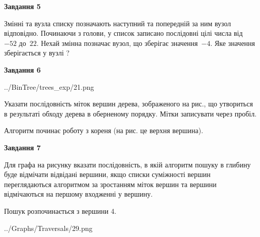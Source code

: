 \documentclass[12pt, ukrainian]{article}
\begin{document}
{\begin {large}
{\begin {center}\textbf{Завдання 5}\end {center}}\par
Змінні  та  вузла списку позначають наступний та попередній за ним вузол відповідно. Починаючи з голови, у список записано послідовні цілі числа від~$-52$ до~$22$. Нехай змінна  позначає вузол, що зберігає значення~$-4$.
Яке значення зберігається у вузлі  ?\par
\newpage

{\begin {center}\textbf{Завдання 6}\end {center}}\par

\begin{center}
	{../BinTree/trees_exp/21.png}
\end{center}
Указати послідовність міток вершин дерева, зображеного на рис., що утвориться в результаті обходу дерева в оберненому порядку. Мітки записувати через пробіл.\par Алгоритм починає роботу з кореня (на рис. це верхня вершина).\par
\newpage

{\begin {center}\textbf{Завдання 7}\end {center}}\par
Для графа на рисунку вказати послідовність, в якій алгоритм пошуку в глибину буде відмічати відвідані вершини, якщо списки суміжності вершин переглядаються алгоритмом за зростанням міток вершин та вершини відмічаються на першому вход\-женні у вершину.\par
Пошук розпочинається з вершини 4.\par

\begin{center}
	{../Graphs/Traversals/29.png}
\end{center}\par
\newpage


\end{large}}
\end{document}
